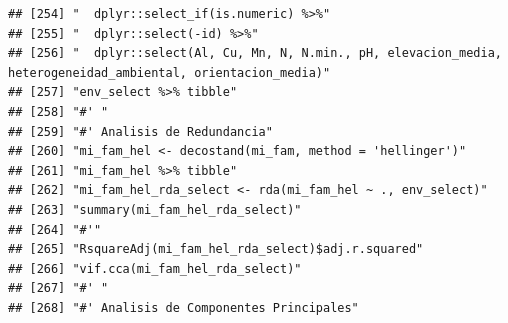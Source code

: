 \documentclass[11pt,]{article}
\begin{document}
\begin{verbatim}
## [254] "  dplyr::select_if(is.numeric) %>%"                                                                                                                                    
## [255] "  dplyr::select(-id) %>%"                                                                                                                                              
## [256] "  dplyr::select(Al, Cu, Mn, N, N.min., pH, elevacion_media, heterogeneidad_ambiental, orientacion_media)"                                                              
## [257] "env_select %>% tibble"                                                                                                                                                 
## [258] "#' "                                                                                                                                                                   
## [259] "#' Analisis de Redundancia"                                                                                                                                            
## [260] "mi_fam_hel <- decostand(mi_fam, method = 'hellinger')"                                                                                                                 
## [261] "mi_fam_hel %>% tibble"                                                                                                                                                 
## [262] "mi_fam_hel_rda_select <- rda(mi_fam_hel ~ ., env_select)"                                                                                                              
## [263] "summary(mi_fam_hel_rda_select)"                                                                                                                                        
## [264] "#'"                                                                                                                                                                    
## [265] "RsquareAdj(mi_fam_hel_rda_select)$adj.r.squared"                                                                                                                       
## [266] "vif.cca(mi_fam_hel_rda_select)"                                                                                                                                        
## [267] "#' "                                                                                                                                                                   
## [268] "#' Analisis de Componentes Principales"                                                                                                                                

\end{verbatim}
\end{document}
